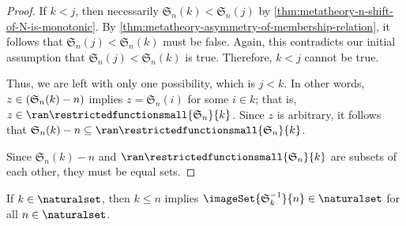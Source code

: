 \begin{proof}
    \vspace{0.3cm}
    \noindent
    If \( k < j \), then necessarily \( \mathfrak{S}_{n}(k) < \mathfrak{S}_{n}(j)  \) by \cref{thm:metatheory-n-shift-of-N-is-monotonic}.
    By \cref{thm:metatheory-asymmetry-of-membership-relation}, it follows that \( \mathfrak{S}_{n}(j) < \mathfrak{S}_{n}(k) \) must be false.
    Again, this contradicts our initial assumption that \( \mathfrak{S}_{n}(j) < \mathfrak{S}_{n}(k) \) is true.
    Therefore, \( k < j \) cannot be true.

    \vspace{0.3cm}
    \noindent
    Thus, we are left with only one possibility, which is \( j < k \).
    In other words, \( z \in \mleft( \mathfrak{S}_{n}(k) - n \mright) \) implies \( z = \mathfrak{S}_{n}(i) \) for some \( i \in k \);
    that is, \( z \in \ran \restrictedfunctionsmall{ \mathfrak{S}_{n} }{k} \).
    Since \( z \) is arbitrary, it follows that \( \mathfrak{S}_{n}(k) - n \subseteq \ran \restrictedfunctionsmall{\mathfrak{S}_{n}}{k} \).

    \vspace{0.3cm}
    \noindent
    Since \( \mathfrak{S}_{n}(k) - n \) and \( \ran \restrictedfunctionsmall{\mathfrak{S}_{n}}{k} \) are subsets of each other, they must be equal sets.
\end{proof}

\begin{thm}
     \label{thm:metatheory-image-of-a-natural-number-under-an-inverse-n-shift-is-also-a-natural-number}
    If \( k \in \naturalset \), then \( k \leq n \) implies \( \imageSet{\mathfrak{S}^{-1}_{k}}{n} \in \naturalset \) for all \( n \in \naturalset \).
\end{thm}

